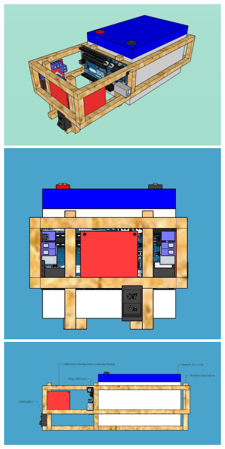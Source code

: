 \documentclass[11pt,a4paper]{article}
\begin{document}
        \begin{figure}[H]
          \centering
          \includegraphics[scale=0.25]{ROVInterieurVueGlobale.jpg}
          \includegraphics[scale=0.25]{ROVInterieurFace.jpg}
          \includegraphics[scale=0.22]{ROVInterieurGauche.jpg}

\end{figure}
\end{document}
